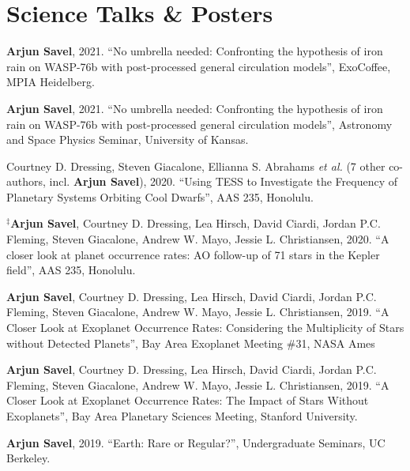 \documentclass[letterpaper,10.5pt]{article}
\newcommand{\resumeSubHeadingListStart}{\begin{itemize}[leftmargin=*]}
\newcommand{\shorterSection}[1]{\vspace{-10pt}\section{#1}}
\begin{document}
\shorterSection{Science Talks \& Posters}
\small
  \begin{list}{}{\cvlist}
  
 \item[{\color{numcolor}\scriptsize10}] \textbf{Arjun Savel}, 2021. ``No umbrella needed: Confronting the hypothesis of iron rain on WASP-76b with post-processed general circulation models'', ExoCoffee, MPIA Heidelberg.
  
\item[{\color{numcolor}\scriptsize9}] \textbf{Arjun Savel}, 2021. ``No umbrella needed: Confronting the hypothesis of iron rain on WASP-76b with post-processed general circulation models'', Astronomy and Space Physics Seminar, University of Kansas.

  
\item[{\color{numcolor}\scriptsize8}] Courtney D. Dressing, Steven Giacalone, Ellianna S. Abrahams \emph{et al.} (7 other co-authors, incl. \textbf{Arjun Savel}), 2020. ``Using TESS to Investigate the Frequency of Planetary Systems Orbiting Cool Dwarfs'', AAS 235, Honolulu.

\item[{\color{numcolor}\scriptsize7}] $^\ddagger$\textbf{Arjun Savel}, Courtney D. Dressing, Lea Hirsch, David Ciardi, Jordan P.C. Fleming, Steven Giacalone, Andrew W. Mayo, Jessie L. Christiansen, 2020. “A closer look at planet occurrence rates: AO follow-up of 71 stars in the Kepler field”, AAS 235, Honolulu.

\item[{\color{numcolor}\scriptsize6}] \textbf{Arjun Savel}, Courtney D. Dressing, Lea Hirsch, David Ciardi, Jordan P.C. Fleming, Steven Giacalone, Andrew W. Mayo, Jessie L. Christiansen, 2019. “A Closer Look at Exoplanet Occurrence Rates: Considering the Multiplicity of Stars without Detected Planets”, Bay Area Exoplanet Meeting \#31, NASA Ames

\item[{\color{numcolor}\scriptsize5}] \textbf{Arjun Savel}, Courtney D. Dressing, Lea Hirsch, David Ciardi, Jordan P.C. Fleming, Steven Giacalone, Andrew W. Mayo, Jessie L. Christiansen, 2019. “A Closer Look at Exoplanet Occurrence Rates: The Impact of Stars Without Exoplanets”, Bay Area Planetary Sciences Meeting, Stanford University.

\item[{\color{numcolor}\scriptsize4}] \textbf{Arjun Savel}, 2019. “Earth: Rare or Regular?”, Undergraduate Seminars, UC Berkeley.


\end{list}
\end{document}
